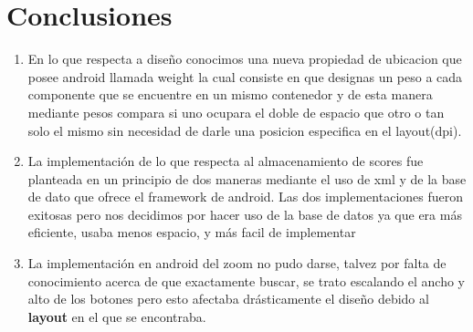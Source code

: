 \documentclass[11pt]{article}
\begin{document}
\paragraph{}
\paragraph{}
\paragraph{} 
\paragraph{} 
\paragraph{} 
\paragraph{} 
\paragraph{}
\paragraph{}

\section{Conclusiones}
\begin{enumerate}
\item
En lo que respecta a diseño conocimos una nueva propiedad de ubicacion que posee android llamada weight la cual consiste en que designas un peso a cada componente que se encuentre en un mismo contenedor y de esta manera mediante pesos compara si uno ocupara el doble de espacio que otro o tan solo el mismo sin necesidad de darle una posicion especifica en el layout(dpi)\cite{android}.
\item
La implementación de lo que respecta al almacenamiento de scores fue planteada en un principio de dos maneras mediante el uso de xml y de la base de dato que ofrece el framework de android. Las dos implementaciones fueron exitosas pero nos decidimos por hacer uso de la base de datos ya que era más eficiente, usaba menos espacio, y más facil de implementar \cite{sql} \cite{xml}
\item
La implementación en android del zoom no pudo darse, talvez por falta de conocimiento acerca de que exactamente buscar, se trato escalando el ancho y alto de los botones pero esto afectaba drásticamente el diseño debido al {\textbf{layout}} en el que se encontraba.
\end{enumerate}


\end{document}

